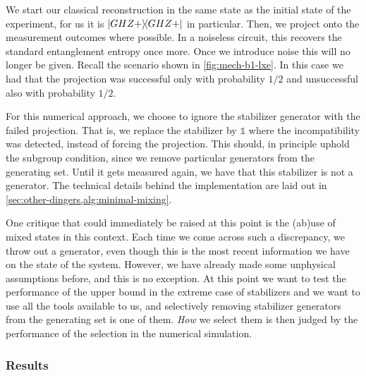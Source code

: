 We start our
classical reconstruction in the same state as the initial state of the
experiment, for us it is $\dyad{GHZ+}$ in particular. Then, we project onto the
measurement outcomes where possible. In a noiseless circuit, this recovers the
standard entanglement entropy once more. Once we introduce noise this will no
longer be given. Recall the scenario shown in \cref{fig:mech-b1-lxe}. In this
case we had that the projection was successful only with probability
$1 /2$ and unsuccessful also with probability $1 /2$.

For this numerical approach, we choose to ignore the stabilizer generator with
the failed projection. That is, we replace the stabilizer by $\mathds{1}$ where
the incompatibility was detected, instead of forcing the projection. This
should, in principle uphold the subgroup condition, since we remove particular
generators from the generating set. Until it gets measured again, we have that
this stabilizer is not a generator. The technical details behind the
implementation are laid out in \cref{sec:other-dingers,alg:minimal-mixing}.

One critique that could immediately be raised at this point is the (ab)use of
mixed states in this context. Each time we come across such a discrepancy, we
throw out a generator, even though this is the most recent information we have
on the state of the system. However, we have already made some unphysical
assumptions before, and this is no exception. At this point we want to test the
performance of the upper bound in the extreme case of stabilizers and we want
to use all the tools available to us, and selectively removing stabilizer
generators from the generating set is one of them. \emph{How} we select them is
then judged by the performance of the selection in the numerical simulation.

\subsubsection{Results}


